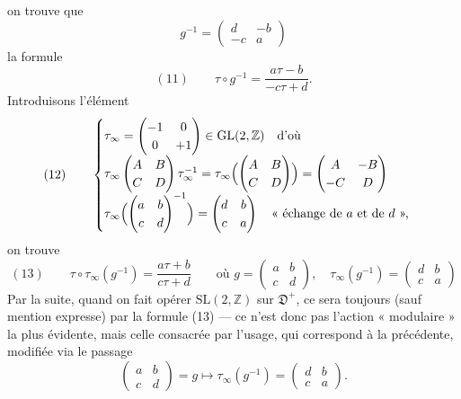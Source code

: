 \documentclass[11pt,a4paper]{article}
\begin{document}
on trouve que
\[
g^{-1} = \begin{pmatrix} d & -b \\ -c & a \end{pmatrix}
\]
la formule
\[
(11)\qquad \tau \circ g^{-1} = \frac{a\tau - b}{-c\tau + d} .
\]
Introduisons l'élément
\[
(12)\qquad
\begin{cases}
\tau_\infty = \begin{pmatrix} -1 & 0 \\ 0 & +1 \end{pmatrix} \in \mathrm{GL}(2,\mathbb{Z})
\quad \text{d'où} \\[6pt]
\tau_\infty \begin{pmatrix} A & B \\ C & D \end{pmatrix} \tau_\infty^{-1}
= \tau_\infty\Bigl(\begin{pmatrix} A & B \\ C & D \end{pmatrix}\Bigr)
= \begin{pmatrix} A & -B \\ -C & D \end{pmatrix} \\[6pt]
\tau_\infty\Bigl(\begin{pmatrix} a & b \\ c & d \end{pmatrix}^{-1}\Bigr)
= \begin{pmatrix} d & b \\ c & a \end{pmatrix}
\quad \text{« échange de } a \text{ et de } d \text{ »,}
\end{cases}
\]
on trouve
\[
(13)\qquad \tau \circ \tau_\infty(g^{-1}) = \frac{a\tau + b}{c\tau + d}
\qquad \text{où } g = \begin{pmatrix} a & b \\ c & d \end{pmatrix},\quad
\tau_\infty(g^{-1}) = \begin{pmatrix} d & b \\ c & a \end{pmatrix}
\]
Par la suite, quand on fait opérer $\mathrm{SL}(2,\mathbb{Z})$ sur
$\mathfrak{D}^+$, ce sera toujours (sauf mention expresse) par la
formule (13) --- ce n'est donc pas l'action « modulaire » la plus évidente, mais
celle consacrée par l'usage, qui correspond  à la
précédente, modifiée via le passage
\[
\begin{pmatrix} a & b \\ c & d \end{pmatrix} = g \longmapsto
\tau_\infty(g^{-1}) = \begin{pmatrix} d & b \\ c & a \end{pmatrix} .
\]
\end{document}

